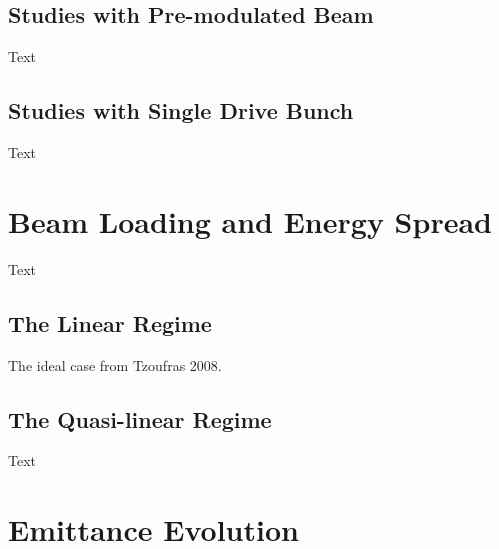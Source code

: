 
\subsection{Studies with Pre-modulated Beam}
\label{Sim:PBPreMod}

Text


\subsection{Studies with Single Drive Bunch}
\label{Sim:PBSingle}

Text


\section{Beam Loading and Energy Spread}
\label{Sim:BLoad}

Text


\subsection{The Linear Regime}
\label{Sim:Lin}

The ideal case from Tzoufras 2008.


\subsection{The Quasi-linear Regime}
\label{Sim:QLin}

Text


\section{Emittance Evolution}
\label{Sim:Emitt}

